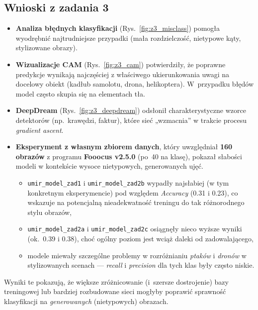\noindent

\subsection{Wnioski z zadania 3}

\begin{itemize}
    \item \textbf{Analiza błędnych klasyfikacji} (Rys.~\ref{fig:z3_misclass}) pomogła wyodrębnić najtrudniejsze przypadki (mała rozdzielczość, nietypowe kąty, stylizowane obrazy). 
    \item \textbf{Wizualizacje CAM} (Rys.~\ref{fig:z3_cam}) potwierdziły, że poprawne predykcje wynikają najczęściej z właściwego ukierunkowania uwagi na docelowy obiekt (kadłub samolotu, drona, helikoptera). W~przypadku błędów model często skupia się na elementach tła.
    \item \textbf{DeepDream} (Rys.~\ref{fig:z3_deepdream}) odsłonił charakterystyczne wzorce detektorów (np.\ krawędzi, faktur), które sieć „wzmacnia” w trakcie procesu \emph{gradient ascent}.
    \item \textbf{Eksperyment z własnym zbiorem danych}, który uwzględniał \textbf{160 obrazów} z programu \textbf{Fooocus v2.5.0} (po~40 na klasę), pokazał słabości modeli w kontekście wysoce nietypowych, generowanych ujęć. 
    \begin{itemize}
        \item \texttt{umir\_model\_zad1} i \texttt{umir\_model\_zad2b} wypadły najsłabiej (w tym konkretnym eksperymencie) pod względem \emph{Accuracy} (0.31 i 0.23), co wskazuje na potencjalną nieadekwatność treningu do tak różnorodnego stylu obrazów,
        \item \texttt{umir\_model\_zad2a} i \texttt{umir\_model\_zad2c} osiągnęły nieco wyższe wyniki (ok.\ 0.39 i 0.38), choć ogólny poziom jest wciąż daleki od zadowalającego,
        \item modele miewały szczególne problemy w rozróżnianiu \emph{ptaków} i \emph{dronów} w stylizowanych scenach — \emph{recall} i \emph{precision} dla tych klas były często niskie.
    \end{itemize}
\end{itemize}

\noindent
Wyniki te pokazują, że większe zróżnicowanie (i~szersze dostrojenie) bazy treningowej lub bardziej rozbudowane sieci mogłyby poprawić sprawność klasyfikacji na \emph{generowanych} (nietypowych) obrazach. 
